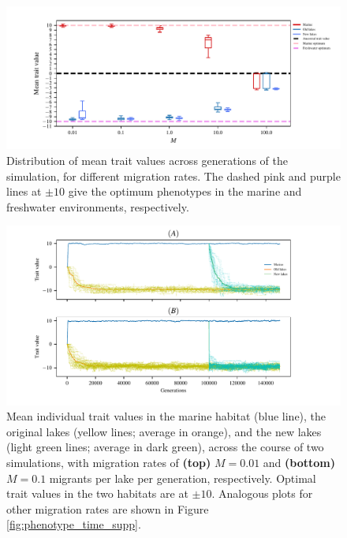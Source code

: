 \documentclass{article}
\begin{document}
\begin{figure}
    \begin{center}
          \includegraphics{Final_Plots/Pheno_Dist.pdf}
          \caption{
            Distribution of mean trait values across generations of the simulation,
            for different migration rates.
            The dashed pink and purple lines at $\pm 10$ give the optimum phenotypes
            in the marine and freshwater environments, respectively.
        }
          \label{fig:MeanPhenotype}
    \end{center}
\end{figure}

\begin{figure}
    \begin{center}
        \includegraphics{Final_Plots/Pheno_Time.pdf}
          \caption{ 
                Mean individual trait values in the marine habitat (blue line),
                the original lakes (yellow lines; average in orange),
                and the new lakes (light green lines; average in dark green),
                across the course of two simulations, with migration rates of
                \textbf{(top)} $M=0.01$ and
                \textbf{(bottom)} $M=0.1$ 
                migrants per lake per generation, respectively.
                Optimal trait values in the two habitats are at $\pm 10$.
                    Analogous plots for other migration rates
                    are shown in Figure \ref{fig:phenotype_time_supp}.
        }
          \label{fig:phenotype_time}
    \end{center}
\end{figure}
\end{document}
